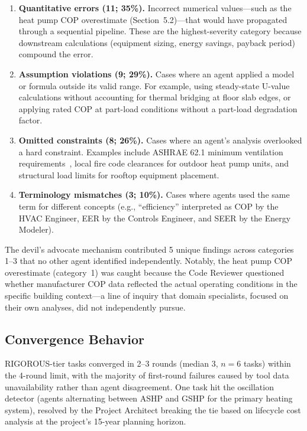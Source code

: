 \documentclass[11pt,a4paper]{article}
\begin{document}
\begin{enumerate}
    \item \textbf{Quantitative errors (11; 35\%).} Incorrect numerical values---such as the heat pump COP overestimate (Section~5.2)---that would have propagated through a sequential pipeline. These are the highest-severity category because downstream calculations (equipment sizing, energy savings, payback period) compound the error.
    \item \textbf{Assumption violations (9; 29\%).} Cases where an agent applied a model or formula outside its valid range. For example, using steady-state U-value calculations without accounting for thermal bridging at floor slab edges, or applying rated COP at part-load conditions without a part-load degradation factor.
    \item \textbf{Omitted constraints (8; 26\%).} Cases where an agent's analysis overlooked a hard constraint. Examples include ASHRAE 62.1 minimum ventilation requirements~\cite{ashrae901}, local fire code clearances for outdoor heat pump units, and structural load limits for rooftop equipment placement.
    \item \textbf{Terminology mismatches (3; 10\%).} Cases where agents used the same term for different concepts (e.g., ``efficiency'' interpreted as COP by the HVAC Engineer, EER by the Controls Engineer, and SEER by the Energy Modeler).
\end{enumerate}

The devil's advocate mechanism contributed 5 unique findings across categories 1--3 that no other agent identified independently. Notably, the heat pump COP overestimate (category~1) was caught because the Code Reviewer questioned whether manufacturer COP data reflected the actual operating conditions in the specific building context---a line of inquiry that domain specialists, focused on their own analyses, did not independently pursue.

\subsection{Convergence Behavior}

RIGOROUS-tier tasks converged in 2--3 rounds (median 3, $n = 6$ tasks) within the 4-round limit, with the majority of first-round failures caused by tool data unavailability rather than agent disagreement. One task hit the oscillation detector (agents alternating between ASHP and GSHP for the primary heating system), resolved by the Project Architect breaking the tie based on lifecycle cost analysis at the project's 15-year planning horizon.
\end{document}

